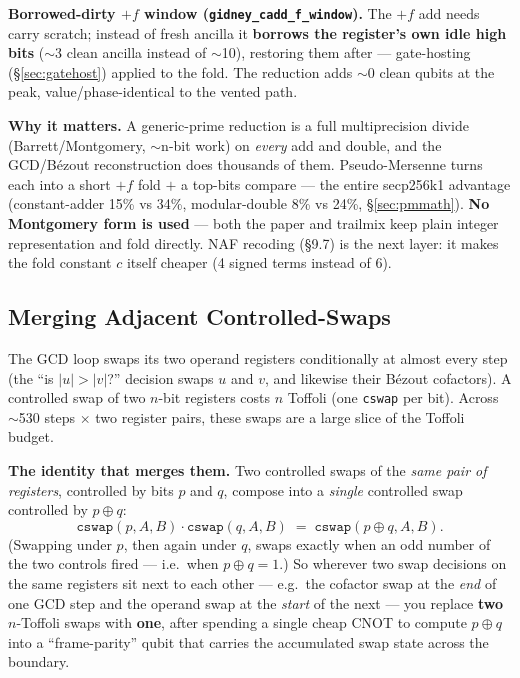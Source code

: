 \documentclass[11pt,a4paper]{article}
\begin{document}
\textbf{Borrowed-dirty $+f$ window (\lstinline{gidney_cadd_f_window}).} The $+f$ add needs carry
scratch; instead of fresh ancilla it \textbf{borrows the register's own idle high bits} ($\sim$3
clean ancilla instead of $\sim$10), restoring them after --- gate-hosting (\S\ref{sec:gatehost})
applied to the fold. The reduction adds $\sim$0 clean qubits at the peak, value/phase-identical to
the vented path.

\textbf{Why it matters.} A generic-prime reduction is a full multiprecision divide
(Barrett/Montgomery, $\sim$n-bit work) on \emph{every} add and double, and the GCD/B\'ezout
reconstruction does thousands of them. Pseudo-Mersenne turns each into a short $+f$ fold $+$ a
top-bits compare --- the entire secp256k1 advantage (constant-adder 15\% vs 34\%, modular-double 8\%
vs 24\%, \S\ref{sec:pmmath}). \textbf{No Montgomery form is used} --- both the paper and trailmix
keep plain integer representation and fold directly. NAF recoding (\S9.7) is the next layer: it makes
the fold constant $c$ itself cheaper (4 signed terms instead of 6).

\subsection{Merging Adjacent Controlled-Swaps}
\label{sec:cswapmerge}

The GCD loop swaps its two operand registers conditionally at almost every step (the ``is
$|u| > |v|$?'' decision swaps $u$ and $v$, and likewise their B\'ezout cofactors). A controlled swap
of two $n$-bit registers costs $n$ Toffoli (one \texttt{cswap} per bit). Across $\sim$530 steps
$\times$ two register pairs, these swaps are a large slice of the Toffoli budget.

\textbf{The identity that merges them.} Two controlled swaps of the \emph{same pair of registers},
controlled by bits $p$ and $q$, compose into a \emph{single} controlled swap controlled by
$p \oplus q$:
\[
  \texttt{cswap}(p, A, B)\cdot\texttt{cswap}(q, A, B) \;=\; \texttt{cswap}(p \oplus q, A, B).
\]
(Swapping under $p$, then again under $q$, swaps exactly when an odd number of the two controls fired
--- i.e.\ when $p \oplus q = 1$.) So wherever two swap decisions on the same registers sit next to
each other --- e.g.\ the cofactor swap at the \emph{end} of one GCD step and the operand swap at the
\emph{start} of the next --- you replace \textbf{two} $n$-Toffoli swaps with \textbf{one}, after
spending a single cheap CNOT to compute $p \oplus q$ into a ``frame-parity'' qubit that carries the
accumulated swap state across the boundary.
\end{document}
